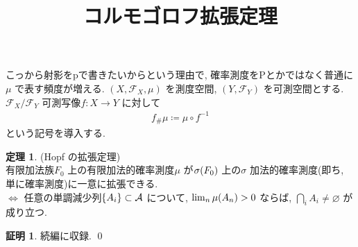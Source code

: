 \documentclass[10pt, fleqn, label-section=none]{bxjsarticle}
\title{コルモゴロフ拡張定理}
\date{}
\author{}
\theoremstyle{definition}
\newtheorem{thm}[dfn]{定理}
\newtheorem*{pf*}{証明}
\newcommand{\paren}[1]{\mleft( #1\mright )}
\newcommand{\cbra}[1]{\mleft\{#1\mright\}}
\newcommand{\LR}{\Leftrightarrow}
\renewcommand{\;}{\, ; \,}
\begin{document}
\maketitle



\section{}

こっから射影をpで書きたいからという理由で, 確率測度をPとかではなく普通に$\mu$ で表す頻度が増える.
$(X, \mathcal F _X, \mu) $ を測度空間, $(Y, \mathcal F_Y)$ を可測空間とする.   $\mathcal F_X / \mathcal F_Y$ 可測写像$f: X \rightarrow Y$ に対して
\begin{align*} f_{\#} \mu \coloneqq \mu\circ f^{-1} \end{align*}
という記号を導入する. 

\begin{thm}
(Hopf の拡張定理) \\
有限加法族$ F _0$ 上の有限加法的確率測度$\mu$ が$\sigma\paren{ F _0}$ 上の$\sigma$ 加法的確率測度(即ち, 単に確率測度)に一意に拡張できる. \\
$\LR$ 任意の単調減少列$\cbra{A_i} \subset \mathcal{A}$ について, $\lim_n \mu\paren{A_n} > 0$ ならば, $\bigcap_i A_i \neq \varnothing$ が成り立つ.

\end{thm}
\begin{pf*}
続編に収録.
\qed
\end{pf*}
\end{document}
